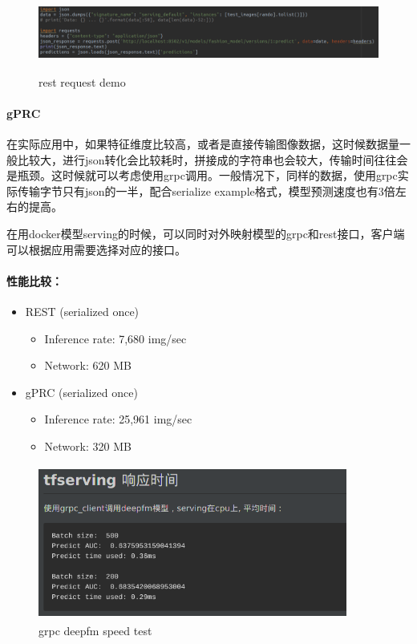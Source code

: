 \documentclass[12pt,a4paper,oneside]{article}
\begin{document}
\begin{CJK*}{UTF8}{gbsn}
\begin{figure}[H]
\centering
\includegraphics[width=6in,height=1.0in]{restrequest}
\caption{rest request demo}
\end{figure}

\paragraph{gPRC}
在实际应用中，如果特征维度比较高，或者是直接传输图像数据，这时候数据量一般比较大，进行json转化会比较耗时，拼接成的字符串也会较大，传输时间往往会是瓶颈。这时候就可以考虑使用grpc调用。一般情况下，同样的数据，使用grpc实际传输字节只有json的一半，配合serialize example格式，模型预测速度也有3倍左右的提高。

在用docker模型serving的时候，可以同时对外映射模型的grpc和rest接口，客户端可以根据应用需要选择对应的接口。

\paragraph{性能比较：}
\begin{itemize}
\item REST (serialized once)
\begin{itemize}
\item Inference rate: 7,680 img/sec
\item Network: 620 MB
\end{itemize}
\item gPRC (serialized once)
\begin{itemize}
\item Inference rate: 25,961 img/sec
\item Network: 320 MB
\end{itemize}
\end{itemize}

\begin{figure}[H]
\centering
\includegraphics[width=4in,height=2.0in]{grpcdeepfm}
\caption{grpc deepfm speed test}
\end{figure}


\end{CJK*}
\end{document}

